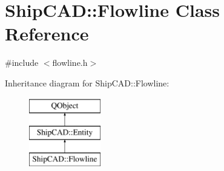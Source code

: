 \hypertarget{classShipCAD_1_1Flowline}{\section{Ship\-C\-A\-D\-:\-:Flowline Class Reference}
\label{classShipCAD_1_1Flowline}
}


{\ttfamily \#include $<$flowline.\-h$>$}

Inheritance diagram for Ship\-C\-A\-D\-:\-:Flowline\-:\begin{figure}[H]
\begin{center}
\leavevmode
\includegraphics[height=3.000000cm]{classShipCAD_1_1Flowline}
\end{center}
\end{figure}
